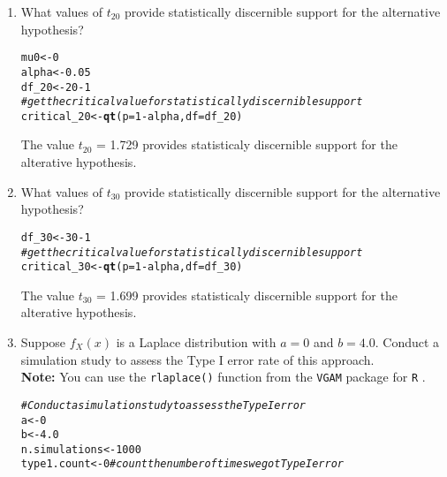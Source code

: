 \documentclass{article}\usepackage[]{graphicx}\usepackage[]{xcolor}
\makeatletter
\newcommand{\hlnum}[1]{\textcolor[rgb]{0.686,0.059,0.569}{#1}}%
\newcommand{\hlcom}[1]{\textcolor[rgb]{0.678,0.584,0.686}{\textit{#1}}}%
\newcommand{\hlopt}[1]{\textcolor[rgb]{0,0,0}{#1}}%
\newcommand{\hldef}[1]{\textcolor[rgb]{0.345,0.345,0.345}{#1}}%
\newcommand{\hlkwb}[1]{\textcolor[rgb]{0.69,0.353,0.396}{#1}}%
\newcommand{\hlkwc}[1]{\textcolor[rgb]{0.333,0.667,0.333}{#1}}%
\newcommand{\hlkwd}[1]{\textcolor[rgb]{0.737,0.353,0.396}{\textbf{#1}}}%
\newenvironment{kframe}{%
 \def\at@end@of@kframe{}%
 \ifinner\ifhmode%
  \def\at@end@of@kframe{\end{minipage}}%
  \begin{minipage}{\columnwidth}%
 \fi\fi%
 \def\FrameCommand##1{\hskip\@totalleftmargin \hskip-\fboxsep
 \colorbox{shadecolor}{##1}\hskip-\fboxsep
     \hskip-\linewidth \hskip-\@totalleftmargin \hskip\columnwidth}%
 \MakeFramed {\advance\hsize-\width
   \@totalleftmargin\z@ \linewidth\hsize
   \@setminipage}}%
 {\par\unskip\endMakeFramed%
 \at@end@of@kframe}
\newenvironment{knitrout}{}{} %
\makeatother
\begin{document}
\begin{enumerate}
\begin{enumerate}
  \item What values of $t_{20}$ provide statistically discernible support for the
  alternative hypothesis?
\begin{knitrout}\scriptsize
{}\color{fgcolor}\begin{kframe}
\begin{alltt}
\hldef{mu0} \hlkwb{<-} \hlnum{0}
\hldef{alpha} \hlkwb{<-} \hlnum{0.05}
\hldef{df_20} \hlkwb{<-} \hlnum{20} \hlopt{-}\hlnum{1}
\hlcom{#get the critical value for statistically discernible support}
\hldef{critical_20} \hlkwb{<-} \hlkwd{qt}\hldef{(}\hlkwc{p} \hldef{=} \hlnum{1} \hlopt{-} \hldef{alpha,} \hlkwc{df} \hldef{= df_20)}
\end{alltt}
\end{kframe}
\end{knitrout}
The value $t_{20}$ = 1.729 provides statisticaly discernible support for the alterative hypothesis.
  \item What values of $t_{30}$ provide statistically discernible support for the
  alternative hypothesis?
\begin{knitrout}\scriptsize
{}\color{fgcolor}\begin{kframe}
\begin{alltt}
\hldef{df_30} \hlkwb{<-} \hlnum{30} \hlopt{-}\hlnum{1}
\hlcom{#get the critical value for statistically discernible support}
\hldef{critical_30} \hlkwb{<-} \hlkwd{qt}\hldef{(}\hlkwc{p} \hldef{=} \hlnum{1} \hlopt{-} \hldef{alpha,} \hlkwc{df} \hldef{= df_30)}
\end{alltt}
\end{kframe}
\end{knitrout}
The value $t_{30}$ = 1.699 provides statisticaly discernible support for the alterative hypothesis.
  \item Suppose $f_X(x)$ is a Laplace distribution with $a=0$ and $b=4.0$.
  Conduct a simulation study to assess the Type I error rate of this approach.\\
  \textbf{Note:} You can use the \texttt{rlaplace()} function from the \texttt{VGAM}
  package for \texttt{R} \citep{VGAM}.
\begin{knitrout}\scriptsize
{}\color{fgcolor}\begin{kframe}
\begin{alltt}
\hlcom{#Conduct a simulation study to assess the Type I error }
\hldef{a} \hlkwb{<-} \hlnum{0}
\hldef{b} \hlkwb{<-} \hlnum{4.0}
\hldef{n.simulations} \hlkwb{<-} \hlnum{1000}
\hldef{type1.count} \hlkwb{<-} \hlnum{0} \hlcom{#count the number of times we got Type I error}


\end{alltt}
\end{kframe}
\end{knitrout}
\end{enumerate}
\end{enumerate}
\end{document}
